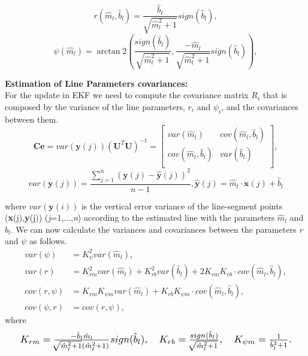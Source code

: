 \documentclass[a4paper]{IEEEtran}
\begin{document}
\begin{equation}
\label{eq:r}
r(\hat{m}_l,\hat{b}_l) = \frac{\hat{b}_l}{\sqrt{\hat{m}_l^2 +1}}sign(\hat{b}_l),
\end{equation}
\begin{equation}
\label{eq:psi}
\psi (\hat{m}_l) = \arctan2 \left(\frac{sign(\hat{b}_l)}{\sqrt{\hat{m}_l^2 +1}},\frac{- \hat{m}_l}{\sqrt{\hat{m}_l^2 +1}}sign(\hat{b}_l)\right),
\end{equation}


\textbf{Estimation of Line Parameters covariances:}\\
For the update in EKF we need to compute the covariance matrix $R_{i}$ that is composed by the variance of the line parameters, $r_{i}$ and $\psi_{i}$, and the covariances between them.
\begin{equation}
\label{eq:Ce}
\textbf{Ce}=var(\textbf{y}(j))(\textbf{U}^T \textbf{U})^{-1}=\begin{bmatrix}
       var(\hat{m}_l) & cov(\hat{m}_l,\hat{b}_l) \\
       cov(\hat{m}_l,\hat{b}_l) & var(\hat{b}_l) \\
  \end{bmatrix},
\end{equation}
\begin{equation}
 \label{eq:vary}
var(\textbf{y}(j))=\frac{\sum_{j=1}^{n} (\textbf{y}(j)-\hat{\textbf{y}}(j))^2}{n-1}, \hat{\textbf{y}}(j)=\hat{m}_l \cdot \textbf{x}(j)+\hat{b}_l
\end{equation}

where $var(\textbf{y}(i))$ is the vertical error variance of the line-segment points (\textbf{x}(j),\textbf{y}(j)) (\textit{j}=1,...,\textit{n}) according to the estimated line with the parameters $\hat{m}_l$ and $\hat{b}_l$. We can now calculate the variances and covariances between the parameters \textit{r} and $\psi$ as follows.
\begin{equation}
\label{eq:varparameters}
\begin{aligned}
var(\psi) & = K_{\psi }^2 var(\hat{m}_l),\\
var(r) & = K_{r m}^2 var(\hat{m}_l)+K_{r b}^2 var(\hat{b}_l)+2 K_{r m}K_{r b} \cdot cov(\hat{m}_l,\hat{b}_l),\\
cov(r,\psi) & = K_{r m} K_{\psi m} var(\hat{m}_l) + K_{r b} K_{\psi m} \cdot cov(\hat{m}_l,\hat{b}_l), \\
cov(\psi ,r) & = cov(r, \psi),
\end{aligned}
\end{equation}
where
\begin{equation}
\label{eq:ks}
\resizebox{1.0\hsize}{!}{ \begin{array}[t]{lcl} K_{r m}=\frac{-\hat{b}_l\hat{m}_l}{\sqrt[]{\hat{m}_l^2+1}(\hat{m}_l^2+1)}sign(\hat{b}_l), \quad K_{r b}=\frac{sign(\hat{b}_l)}{\sqrt[]{\hat{m}_l^2+1}}, \quad K_{\psi m}=\frac{1}{\hat{b}_l^2+1}. 
\end{array}
}
\end{equation}
\end{document}
